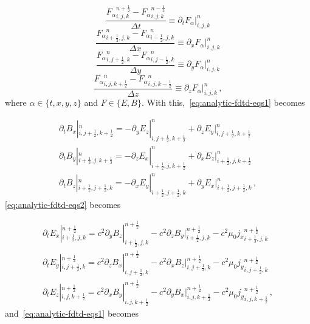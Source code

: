 \documentclass[12pt, class=report, crop=false]{standalone}
\begin{document}
\begin{equation*}
  \frac{{F_\alpha}^{n+\frac{1}{2}}_{i,j,k} - {F_\alpha}^{n-\frac{1}{2}}_{i,j,k}}{\Delta t} \equiv \partial_t F_\alpha|^n_{i,j,k}
\end{equation*}
\begin{equation*}
  \frac{{F_\alpha}^{n}_{i+\frac{1}{2},j,k} - {F_\alpha}^{n}_{i-\frac{1}{2},j,k}}{\Delta x} \equiv \partial_x F_\alpha|^n_{i,j,k}
\end{equation*}
\begin{equation*}
  \frac{{F_\alpha}^{n}_{i,j+\frac{1}{2},k} - {F_\alpha}^{n}_{i,j-\frac{1}{2},k}}{\Delta y} \equiv \partial_y F_\alpha|^n_{i,j,k}
\end{equation*}
\begin{equation*}
  \frac{{F_\alpha}^{n}_{i,j,k+\frac{1}{2}} - {F_\alpha}^{n}_{i,j,k-\frac{1}{2}}}{\Delta z} \equiv \partial_z F_\alpha|^n_{i,j,k}\,,
\end{equation*}
where \(\alpha \in \{t,x,y,z\}\) and \(F \in \{E,B\}\). With this,~\cref{eq:analytic-fdtd-eqs1} becomes

\begin{subequations}
  \begin{align}
    \partial_t B_x|^n_{i,j+\frac{1}{2},k+\frac{1}{2}} =
    - \partial_y E_z|^n_{i,j+\frac{1}{2},k+\frac{1}{2}} +
    \partial_z E_y|^n_{i,j+\frac{1}{2},k+\frac{1}{2}}
    \\
    \partial_t B_y|^n_{i+\frac{1}{2},j,k+\frac{1}{2}} =
    - \partial_z E_x|^n_{i+\frac{1}{2},j,k+\frac{1}{2}} +
    \partial_x E_z|^n_{i+\frac{1}{2},j,k+\frac{1}{2}}
    \\
    \partial_t B_z|^n_{i+\frac{1}{2},j+\frac{1}{2},k} =
    - \partial_x E_y|^n_{i+\frac{1}{2},j+\frac{1}{2},k} +
    \partial_y E_x|^n_{i+\frac{1}{2},j+\frac{1}{2},k}
    \,,
  \end{align}
\end{subequations}
\cref{eq:analytic-fdtd-eqs2} becomes

\begin{subequations}
  \begin{align}
    \partial_t E_x|^{n+\frac{1}{2}}_{i+\frac{1}{2},j,k} =
    c^2 \partial_y B_z|^{n+\frac{1}{2}}_{i+\frac{1}{2},j,k} -
    c^2 \partial_z B_y|^{n+\frac{1}{2}}_{i+\frac{1}{2},j,k} -
    c^2 \mu_0 {j_x}^{n+\frac{1}{2}}_{i+\frac{1}{2},j,k}
    \\
    \partial_t E_y|^{n+\frac{1}{2}}_{i,j+\frac{1}{2},k} =
    c^2 \partial_z B_x|^{n+\frac{1}{2}}_{i,j+\frac{1}{2},k} -
    c^2 \partial_x B_z|^{n+\frac{1}{2}}_{i,j+\frac{1}{2},k} -
    c^2 \mu_0 {j_y}^{n+\frac{1}{2}}_{i,j+\frac{1}{2},k}
    \\
    \partial_t E_z|^{n+\frac{1}{2}}_{i,j,k+\frac{1}{2}} =
    c^2 \partial_x B_y|^{n+\frac{1}{2}}_{i,j,k+\frac{1}{2}} -
    c^2 \partial_y B_x|^{n+\frac{1}{2}}_{i,j,k+\frac{1}{2}} -
    c^2 \mu_0 {j_y}^{n+\frac{1}{2}}_{i,j,k+\frac{1}{2}}
    \,,
  \end{align}
\end{subequations}
and~\cref{eq:analytic-fdtd-eqs1} becomes
\end{document}
